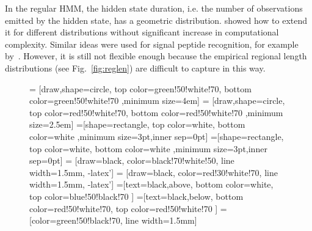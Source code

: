 \documentclass[fleqn,10pt,twoside]{gcb15submission}
\begin{document}
In the regular HMM, the hidden state duration, i.e. the number of observations emitted by the hidden state, has a geometric distribution. \cite{Durbin98biologicalsequence} showed how to extend it for different distributions without significant increase in computational 
complexity. Similar ideas were used for signal peptide recognition, for example by~\cite{2004klla}. 
However, it is still not flexible enough because the empirical regional length distributions (see Fig.~\ref{fig:reglen})
are difficult to capture in this way.

\begin{figure}[h]
\centering
{} = [draw,shape=circle, top color=green!50!white!70, bottom color=green!50!white!70 ,minimum size=4em]
 = [draw,shape=circle, top color=red!50!white!70, bottom color=red!50!white!70 ,minimum size=2.5em]
\def\radius{.7mm} 
=[shape=rectangle, top color=white, bottom color=white ,minimum size=3pt,inner sep=0pt]
=[shape=rectangle, top color=white, bottom color=white ,minimum size=3pt,inner sep=0pt]
\def\n{11}
  = [draw=black, color=black!70!white!50, line width=1.5mm, -latex'] 
  = [draw=black, color=red!30!white!70, line width=1.5mm, -latex']
=[text=black,above, bottom color=white, top color=blue!50!black!70  ]
=[text=black,below, bottom color=red!50!white!70, top color=red!50!white!70  ]
  = [color=green!50!black!70, line width=1.5mm]
\def\names{{"$O_{1,1}$","...","$O_{1,d_1}$", "...","$O_{k, 1}$", "...", "$O_{k, d_k}$"}}%
\end{figure}
\end{document}
